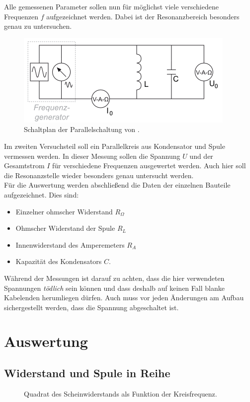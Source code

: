 \documentclass[12pt,a4paper,titlepage,headinclude,bibtotoc]{scrartcl}
\begin{document}
Alle gemessenen Parameter sollen nun für möglichst viele verschiedene Frequenzen $f$ aufgezeichnet werden.
Dabei ist der Resonanzbereich besonders genau zu untersuchen.\\

\begin{figure}[!h]
\centering
\includegraphics[width=0.6\linewidth]{parallel}
\caption{Schaltplan der Parallelschaltung von \cite[4.10.2014, 15:30]{LP14}.}
\label{fig:parallel}
\end{figure}
Im zweiten Versuchsteil soll ein Parallelkreis aus Kondensator und Spule vermessen werden.
In dieser Messung sollen die Spannung $U$ und der Gesamtstrom $I$ für verschiedene Frequenzen ausgewertet werden.
Auch hier soll die Resonanzstelle wieder besonders genau untersucht werden.\\

Für die Auswertung werden abschließend die Daten der einzelnen Bauteile aufgezeichnet.
Dies sind:
\begin{itemize}
\item Einzelner ohmscher Widerstand $R_\Omega$
\item Ohmscher Widerstand der Spule $R_L$
\item Innenwiderstand des Amperemeters $R_A$
\item Kapazität des Kondensators $C$.
\end{itemize}

Während der Messungen ist darauf zu achten, dass die hier verwendeten Spannungen \emph{tödlich} sein können und dass deshalb auf keinen Fall blanke Kabelenden herumliegen dürfen.
Auch muss vor jeden Änderungen am Aufbau sichergestellt werden, dass die Spannung abgeschaltet ist.


\section{Auswertung}
\label{sec:auswertung}
\subsection{Widerstand und Spule in Reihe}
\begin{figure}[!htb]
	\centering
	
	\caption{Quadrat des Scheinwiderstands als Funktion der Kreisfrequenz.}
	\label{fig:messung1}
\end{figure}
\end{document}
